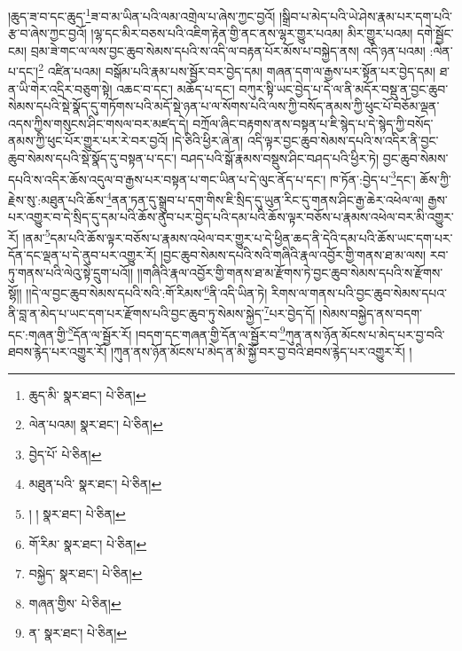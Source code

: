 །ཆུད་ཟ་བ་དང་ཆུད་\footnote{ཆུད་མི་  སྣར་ཐང་།  པེ་ཅིན། }ཟ་བ་མ་ཡིན་པའི་ལམ་འགྲེལ་པ་ཞེས་ཀྱང་བྱའོ། །སྒྲིབ་པ་མེད་པའི་ཡེ་ཤེས་རྣམ་པར་དག་པའི་རྩ་བ་ཞེས་ཀྱང་བྱའོ། །ལྷ་དང་མིར་བཅས་པའི་འཇིག་རྟེན་གྱི་ནང་ནས་ལྷར་གྱུར་པའམ། མིར་གྱུར་པའམ། དགེ་སྦྱོང་ངམ། བྲམ་ཟེ་གང་ལ་ལས་བྱང་ཆུབ་སེམས་དཔའི་ས་འདི་ལ་བརྟན་པོར་མོས་པ་བསྐྱེད་ནས། འདི་ཉན་པའམ། :ལེན་པ་དང་།\footnote{ལེན་པའམ།  སྣར་ཐང་།  པེ་ཅིན། } འཛིན་པའམ། བསྒོམ་པའི་རྣམ་པས་སྦྱོར་བར་བྱེད་དམ། གཞན་དག་ལ་རྒྱས་པར་སྟོན་པར་བྱེད་དམ། ཐ་ན་ཡི་གེར་འདྲིར་བཅུག་སྟེ། འཆང་བ་དང་། མཆོད་པ་དང་། བཀུར་སྟི་ཡང་བྱེད་པ་དེ་ལ་ནི་མདོར་བསྡུ་ན་བྱང་ཆུབ་སེམས་དཔའི་སྡེ་སྣོད་དུ་གཏོགས་པའི་མདོ་སྡེ་ཉན་པ་ལ་སོགས་པའི་ལས་ཀྱི་བསོད་ནམས་ཀྱི་ཕུང་པོ་བཅོམ་ལྡན་འདས་ཀྱིས་གསུངས་ཤིང་གསལ་བར་མཛད་དེ། བཀྲོལ་ཞིང་བརྟགས་ནས་བསྟན་པ་ཇི་སྙེད་པ་དེ་སྙེད་ཀྱི་བསོད་ནམས་ཀྱི་ཕུང་པོར་གྱུར་པར་རེ་བར་བྱའོ། །དེ་ཅིའི་ཕྱིར་ཞེ་ན། འདི་ལྟར་བྱང་ཆུབ་སེམས་དཔའི་ས་འདིར་ནི་བྱང་ཆུབ་སེམས་དཔའི་སྡེ་སྣོད་དུ་བསྟན་པ་དང་། བཤད་པའི་སྒོ་རྣམས་བསྡུས་ཤིང་བཤད་པའི་ཕྱིར་ཏེ། བྱང་ཆུབ་སེམས་དཔའི་ས་འདིར་ཆོས་འདུལ་བ་རྒྱས་པར་བསྟན་པ་གང་ཡིན་པ་དེ་ལུང་ནོད་པ་དང་། ཁ་ཏོན་:བྱེད་པ་\footnote{བྱེད་པོ་  པེ་ཅིན། }དང་། ཆོས་ཀྱི་རྗེས་སུ་:མཐུན་པའི་ཆོས་\footnote{མཐུན་པའི་  སྣར་ཐང་།  པེ་ཅིན། }ནན་ཏན་དུ་སྒྲུབ་པ་དག་གིས་ཇི་སྲིད་དུ་ཡུན་རིང་དུ་གནས་ཤིང་རྒྱ་ཆེར་འཕེལ་ལ། རྒྱས་པར་འགྱུར་བ་དེ་སྲིད་དུ་དམ་པའི་ཆོས་ནུབ་པར་བྱེད་པའི་དམ་པའི་ཆོས་ལྟར་བཅོས་པ་རྣམས་འཕེལ་བར་མི་འགྱུར་རོ། །ནམ་\footnote{། །  སྣར་ཐང་།  པེ་ཅིན། }དམ་པའི་ཆོས་ལྟར་བཅོས་པ་རྣམས་འཕེལ་བར་གྱུར་པ་དེ་ཕྱིན་ཆད་ནི་དེའི་དམ་པའི་ཆོས་ཡང་དག་པར་དོན་དང་ལྡན་པ་དེ་ནུབ་པར་འགྱུར་རོ། །བྱང་ཆུབ་སེམས་དཔའི་སའི་གཞིའི་རྣལ་འབྱོར་གྱི་གནས་ཐ་མ་ལས། རབ་ཏུ་གནས་པའི་ལེའུ་སྟེ་དྲུག་པའོ།། །།གཞིའི་རྣལ་འབྱོར་གྱི་གནས་ཐ་མ་རྫོགས་ཏེ་བྱང་ཆུབ་སེམས་དཔའི་ས་རྫོགས་སྷོ།། །།དེ་ལ་བྱང་ཆུབ་སེམས་དཔའི་སའི་:གོ་རིམས་\footnote{གོ་རིམ་  སྣར་ཐང་།  པེ་ཅིན། }ནི་འདི་ཡིན་ཏེ། རིགས་ལ་གནས་པའི་བྱང་ཆུབ་སེམས་དཔའ་ནི་བླ་ན་མེད་པ་ཡང་དག་པར་རྫོགས་པའི་བྱང་ཆུབ་ཏུ་སེམས་སྐྱེད་\footnote{བསྐྱེད་  སྣར་ཐང་།  པེ་ཅིན། }པར་བྱེད་དོ། །སེམས་བསྐྱེད་ནས་བདག་དང་:གཞན་གྱི་\footnote{གཞན་གྱིས་  པེ་ཅིན། }དོན་ལ་སྦྱོར་རོ། །བདག་དང་གཞན་གྱི་དོན་ལ་སྦྱོར་བ་\footnote{ན་  སྣར་ཐང་།  པེ་ཅིན། }ཀུན་ནས་ཉོན་མོངས་པ་མེད་པར་བྱ་བའི་ཐབས་རྙེད་པར་འགྱུར་རོ། །ཀུན་ནས་ཉོན་མོངས་པ་མེད་ན་མི་སྐྱོ་བར་བྱ་བའི་ཐབས་རྙེད་པར་འགྱུར་རོ། །
